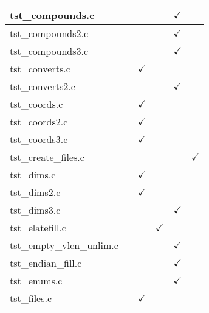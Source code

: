 \begin{table}[H]
\begin{tabular}{|l|c|c|c|c|c|}
tst\_compounds.c        &               &               &               & $\checkmark$  &               \\ \hline
tst\_compounds2.c       &               &               &               & $\checkmark$  &               \\ \hline
tst\_compounds3.c       &               &               &               & $\checkmark$  &               \\ \hline
tst\_converts.c         &               & $\checkmark$  &               &               &               \\ \hline
tst\_converts2.c        &               &               &               & $\checkmark$  &               \\ \hline
tst\_coords.c           &               & $\checkmark$  &               &               &               \\ \hline
tst\_coords2.c          &               & $\checkmark$  &               &               &               \\ \hline
tst\_coords3.c          &               & $\checkmark$  &               &               &               \\ \hline
tst\_create\_files.c    &               &               &               &               & $\checkmark$  \\ \hline
tst\_dims.c             &               & $\checkmark$  &               &               &               \\ \hline
tst\_dims2.c            &               & $\checkmark$  &               &               &               \\ \hline
tst\_dims3.c            &               &               &               & $\checkmark$  &               \\ \hline
tst\_elatefill.c        &               &               & $\checkmark$  &               &               \\ \hline
tst\_empty\_vlen\_unlim.c   &           &               &               & $\checkmark$  &               \\ \hline
tst\_endian\_fill.c     &               &               &               & $\checkmark$  &               \\ \hline
tst\_enums.c            &               &               &               & $\checkmark$  &               \\ \hline
tst\_files.c            &               & $\checkmark$  &               &               &               \\ \hline

\end{tabular}
\end{table}
